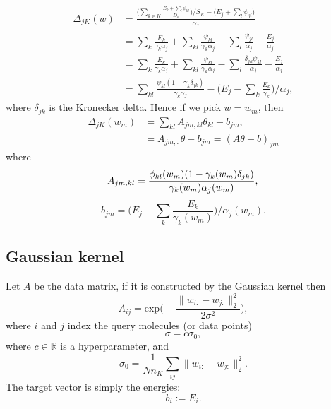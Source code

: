 \documentclass[12pt]{article}
\def\D{\displaystyle}
\begin{document}
\begin{equation}
	\label{eq:delta_split}
	\begin{split}
		\Delta_{jK}(w)&= \frac{\D \Big(\sum_{k\in K} \frac{E_k + \sum_l \psi_{kl}}{D_k} \Big)/ S_K - \Big(E_j + \sum_l \psi_{jl}\Big)}{\alpha_j} \\
		&= \sum_k \frac{E_k}{\gamma_k\alpha_j} + \sum_{kl} \frac{\psi_{kl}}{\gamma_k\alpha_j} - \sum_{l} \frac{\psi_{jl}}{\alpha_j} - \frac{E_j}{\alpha_j}\\
		&= \sum_k \frac{E_k}{\gamma_k\alpha_j} + \sum_{kl} \frac{\psi_{kl}}{\gamma_k\alpha_j} - \sum_{l} \frac{\delta_{jk}\psi_{kl}}{\alpha_j} - \frac{E_j}{\alpha_j}\\
		&= \sum_{kl} \frac{\psi_{kl} (1-\gamma_k\delta_{jk})}{\gamma_k\alpha_j} - \Big(E_j - \sum_k\frac{E_k}{\gamma_k}\Big)/\alpha_j,
	\end{split}
\end{equation}
where $\delta_{jk}$ is the Kronecker delta. Hence if we pick $w = w_m$, then
\begin{equation}
	\begin{split}
		\Delta_{jK}(w_m) &= \sum_{kl} A_{jm, kl} \theta_{kl} - b_{jm}, \\
		&= A_{jm,:}\theta - b_{jm} = (A\theta - b)_{jm}
	\end{split}	
\end{equation}
where
\begin{equation}
	A_{jm, kl} = \frac{\phi_{kl}(w_m)(1 - \gamma_k(w_m) \delta_{jk})}{\gamma_k(w_m) \alpha_j(w_m)},\\
\end{equation}
\begin{equation}
	b_{jm} = \Big(E_j - \sum_k\frac{E_k}{\gamma_k(w_m)}\Big)/\alpha_j(w_m).
\end{equation}

\subsection{Gaussian kernel}
\label{subsec:gaussian}
Let $A$ be the data matrix, if it is constructed by the Gaussian kernel then
\begin{equation}
	\label{eq:gaussian}
	A_{ij} = \text{exp}\Big(-\frac{\|w_{i:} - w_{j:}\|^2_2}{2\sigma^2}\Big),
\end{equation}
where $i$ and $j$ index the query molecules (or data points)
\begin{equation}
	\sigma = c\sigma_0,
\end{equation}
where $c \in \mathbb{R}$ is a hyperparameter, and
\begin{equation}
	\sigma_0 = \frac{1}{Nn_K}\sum_{ij}\|w_{i:} - w_{j:}\|^2_2.
\end{equation} 
The target vector is simply the energies:
\begin{equation}
	\label{eq:lineartargetvector}
	b_i := E_i.
\end{equation}
\end{document}
